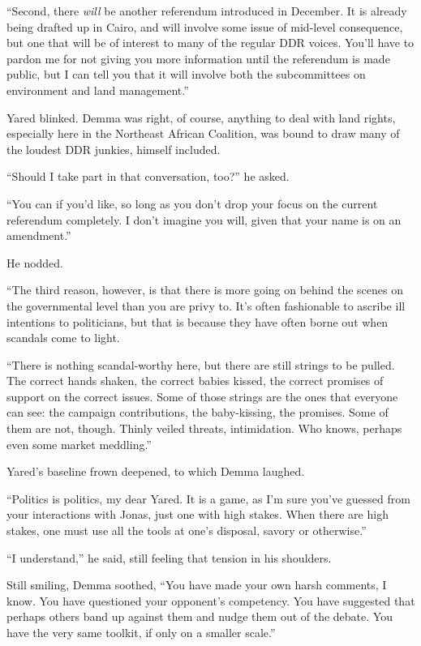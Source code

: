 ``Second, there \emph{will} be another referendum introduced in December. It is already being drafted up in Cairo, and will involve some issue of mid-level consequence, but one that will be of interest to many of the regular DDR voices. You'll have to pardon me for not giving you more information until the referendum is made public, but I can tell you that it will involve both the subcommittees on environment and land management.''

Yared blinked. Demma was right, of course, anything to deal with land rights, especially here in the Northeast African Coalition, was bound to draw many of the loudest DDR junkies, himself included.

``Should I take part in that conversation, too?'' he asked.

``You can if you'd like, so long as you don't drop your focus on the current referendum completely. I don't imagine you will, given that your name is on an amendment.''

He nodded.

``The third reason, however, is that there is more going on behind the scenes on the governmental level than you are privy to. It's often fashionable to ascribe ill intentions to politicians, but that is because they have often borne out when scandals come to light.

``There is nothing scandal-worthy here, but there are still strings to be pulled. The correct hands shaken, the correct babies kissed, the correct promises of support on the correct issues. Some of those strings are the ones that everyone can see: the campaign contributions, the baby-kissing, the promises. Some of them are not, though. Thinly veiled threats, intimidation. Who knows, perhaps even some market meddling.''

Yared's baseline frown deepened, to which Demma laughed.

``Politics is politics, my dear Yared. It is a game, as I'm sure you've guessed from your interactions with Jonas, just one with high stakes. When there are high stakes, one must use all the tools at one's disposal, savory or otherwise.''

``I understand,'' he said, still feeling that tension in his shoulders.

Still smiling, Demma soothed, ``You have made your own harsh comments, I know. You have questioned your opponent's competency. You have suggested that perhaps others band up against them and nudge them out of the debate. You have the very same toolkit, if only on a smaller scale.''

